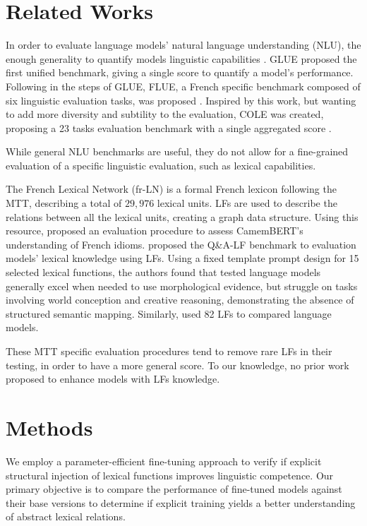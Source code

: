 \documentclass[11pt]{article}
\begin{document}
\section{Related Works}\label{sec:relwork}
In order to evaluate language models' natural language understanding (NLU), the
enough generality to quantify models linguistic capabilities
\citep{niSurveyLargeLanguage2025}. GLUE \cite{niSurveyLargeLanguage2025}
proposed the first unified benchmark, giving a single score to quantify a
model's performance. Following in the steps of GLUE,
FLUE, a French specific benchmark composed of six linguistic evaluation tasks,
was proposed \citep{leFlauBERTUnsupervisedLanguage2020}. Inspired by this work,
but wanting to add more diversity and subtility to the evaluation, COLE was
created, proposing a 23 tasks evaluation benchmark with a single aggregated
score \citep{beaucheminCOLEComprehensiveBenchmark2025}. 

While general NLU benchmarks are useful, they do not allow for a fine-grained
evaluation of a specific linguistic evaluation, such as lexical capabilities.

The French Lexical Network (fr-LN) \citep{11403/lexical-system-fr/v3.2} is a
formal French lexicon following the MTT, describing a total of $29,976$ lexical
units. LFs are used to describe the relations between all the lexical units,
creating a graph data structure. Using this resource,
\citet{liuAssessingBERTsSensitivity2024} proposed 
an evaluation procedure to assess CamemBERT's \cite{martin-etal-2020-camembert}
understanding of French idioms. \citet{petrovQALFFrenchQuestionAnswering2025}
proposed the Q\&A-LF benchmark to evaluation models' lexical knowledge using
LFs. Using a fixed template prompt design for 15 selected lexical functions,
the authors found that tested language models generally excel when needed to use
morphological evidence, but struggle on tasks involving world conception and
creative reasoning, demonstrating the absence of structured semantic
mapping. Similarly, \citet{liEvaluationCompetenceLexicale2025} used 82 LFs to
compared language models.

These MTT specific evaluation procedures tend to remove rare LFs in their
testing, in order to have a more general score. To our knowledge, no prior work
proposed to enhance models with LFs knowledge.


\section{Methods}
We employ a parameter-efficient fine-tuning approach to verify if explicit structural injection of lexical functions improves linguistic competence. Our primary objective is to compare the performance of fine-tuned models against their base versions to determine if explicit training yields a better understanding of abstract lexical relations.
\end{document}
